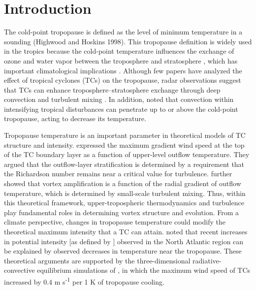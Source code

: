 \chapter{Introduction}
\label{intro}

\indent \indent The cold-point tropopause is defined as the level of minimum temperature in a sounding (Highwood and Hoskins 1998).
This tropopause definition is widely used in the tropics because the cold-point temperature influences the exchange of ozone and water vapor between the troposphere and stratosphere \citep{Moteetal1996}, which has important climatological implications \citep{Holtonetal1995}.
Although few papers have analyzed the effect of tropical cyclones (TCs) on the tropopause, radar observations suggest that TCs can enhance troposphere--stratosphere exchange through deep convection and turbulent mixing \citep{Dasetal2008}.
In addition, \citep{Davisetal2014} noted that convection within intensifying tropical
disturbances can penetrate up to or above the cold-point tropopause, acting to decrease its temperature.

Tropopause temperature is an important parameter in theoretical models of TC structure and intensity.
\cite{EmanuelRotunno2011} expressed the maximum gradient wind speed at the top of the TC boundary layer as a function of upper-level outflow temperature.
They argued that the outflow-layer stratification is determined by a requirement that the Richardson number remains near a critical value for turbulence.
\cite{Emanuel2012} further showed that vortex amplification is a function of the radial gradient of outflow temperature, which is determined by small-scale turbulent mixing.
Thus, within this theoretical framework, upper-tropospheric thermodynamics and turbulence play fundamental roles in determining vortex structure and evolution.
From a climate perspective, changes in tropopause temperature could modify the theoretical maximum intensity that a TC can attain.
\cite{Emanueletal2013} noted that recent increases in potential intensity [as defined by \cite{BisterEmanuel1998}] observed in the North Atlantic region can be explained by observed decreases in temperature near the tropopause.
These theoretical arguments are supported by the three-dimensional radiative-convective equilibrium simulations of \cite{Wangetal2014}, in which the maximum wind speed of TCs increased by 0.4 m s\textsuperscript{-1} per 1 K of tropopause cooling.


